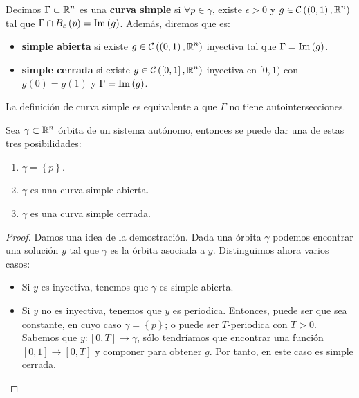 \begin{definition}
Decimos $\displaystyle \Gamma \subset \mathbb{R}^{n} $ es una \textbf{curva simple} si $\displaystyle \forall p \in \gamma  $, existe $\displaystyle \epsilon > 0 $ y $\displaystyle g \in \mathcal{C}\left(\left(0,1\right), \mathbb{R}^{n}\right) $ tal que $\displaystyle \Gamma \cap B_{\varepsilon }\left(p\right)=\operatorname{Im}\left(g\right) $. Además, diremos que es:
\begin{itemize}
\item \textbf{simple abierta} si existe $\displaystyle g \in \mathcal{C}\left(\left(0,1\right), \mathbb{R}^{n}\right) $ inyectiva tal que $\displaystyle \Gamma = \operatorname{Im}\left(g\right) $.
\item \textbf{simple cerrada} si existe $\displaystyle g \in \mathcal{C}\left(\left[0,1\right] , \mathbb{R}^{n}\right) $ inyectiva en $\displaystyle [0,1) $ con $\displaystyle g\left(0\right)=g\left(1\right) $ y $\displaystyle \Gamma = \operatorname{Im}\left(g\right) $. 
\end{itemize}

\end{definition}
\begin{observation}
La definición de curva simple es equivalente a que $\displaystyle \Gamma  $ no tiene autointersecciones. 
\end{observation}
\begin{theorem}
Sea $\displaystyle \gamma\subset \mathbb{R}^{n} $ órbita de un sistema autónomo, entonces se puede dar una de estas tres posibilidades:
\begin{enumerate}
	\item $\displaystyle \gamma = \left\{ p\right\}  $.
	\item $\displaystyle \gamma  $ es una curva simple abierta.
	\item $\displaystyle \gamma  $ es una curva simple cerrada.
\end{enumerate}
\end{theorem}
\begin{proof}
Damos una idea de la demostración. Dada una órbita $\displaystyle \gamma  $ podemos encontrar una solución $\displaystyle y $ tal que $\displaystyle \gamma  $ es la órbita asociada a $\displaystyle y $. Distinguimos ahora varios casos:
\begin{itemize}
\item Si $\displaystyle y $ es inyectiva, tenemos que $\displaystyle \gamma  $ es simple abierta.
\item Si $\displaystyle y $ no es inyectiva, tenemos que $\displaystyle y $ es periodica. Entonces, puede ser que sea constante, en cuyo caso $\displaystyle \gamma = \left\{ p\right\}  $; o puede ser $\displaystyle T $-periodica con $\displaystyle T > 0 $. Sabemos que $\displaystyle y : \left[0,T\right] \to \gamma  $, sólo tendríamos que encontrar una función $\displaystyle \left[0,1\right] \to \left[0,T\right]  $ y componer para obtener $\displaystyle g $. Por tanto, en este caso es simple cerrada. 
\end{itemize}
\end{proof}
